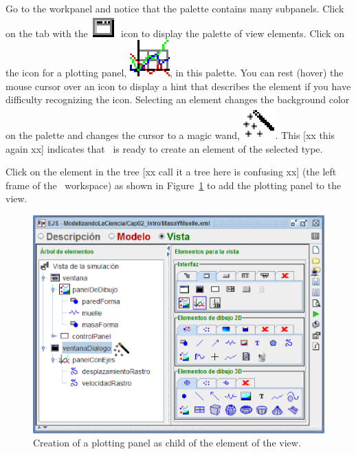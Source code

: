 Go to the  workpanel and notice that the  palette contains many subpanels.  Click on the tab with the \includegraphics[scale=\linescale]{images/Groups/Containers.eps} icon to display the  palette of view elements.  Click on the icon for a plotting panel, \includegraphics[scale=\linescale]{images/Elements/PlottingPanel.eps}, in this palette. You can rest (hover) the mouse cursor over an icon to display a hint that describes the element if you have difficulty recognizing the icon.  Selecting an element changes the background color on the palette and changes the cursor to a magic wand, \includegraphics[scale=\linescale]{images/create.eps}. This [xx this again xx] indicates that \ejs\ is ready to create an element of the selected type.

Click on the  element in the tree [xx call it a tree here is confusing xx] (the left frame of the \ejs\ workspace) as shown in Figure~\ref{fig:02EjsIntro/ModifyViewAddPlottingPanel} to add the plotting panel to the view.

\begin{figure}[htb]
    \centering
  \includegraphics[scale=\scale]{02EjsIntro/images/ModifyViewAddPlottingPanel.eps}
    \caption{Creation of a plotting panel as child of the  element of the view.}
    \label{fig:02EjsIntro/ModifyViewAddPlottingPanel}
\end{figure}

